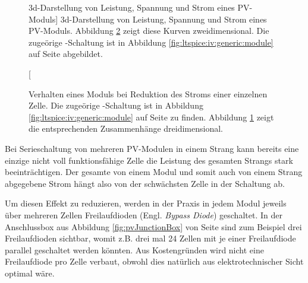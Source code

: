 \begin{figure}[h!tb]
    \centering
    
    \caption
    [3d-Darstellung von Leistung, Spannung und Strom eines PV-Moduls]
    {%
        3d-Darstellung  von  Leistung,  Spannung und  Strom  eines  PV-Moduls.
        Abbildung    \ref{fig:simu:iv-curves:module:generic}    zeigt    diese
        Kurven  zweidimensional.    Die  zuge\"orige  -Schaltung
        ist   in  Abbildung   \ref{fig:ltspice:iv:generic:module}  auf   Seite
        \pageref{fig:ltspice:iv:generic:module} abgebildet.%
    }
    \label{fig:simu:iv-curves:module:generic:3d}
\end{figure}

\begin{figure}[h!tb]
    \centering
    
    \caption[IV- und PV-Kurven eines PV-Moduls bei Leistungseinbruch]{%
        Verhalten   eines    Moduls   bei    Reduktion   des    Stroms   einer
        einzelnen   Zelle.
        Die   zuge\"orige  -Schaltung   ist
        in    Abbildung    \ref{fig:ltspice:iv:generic:module}    auf    Seite
        \pageref{fig:ltspice:iv:generic:module}    zu    finden.     Abbildung
        \ref{fig:simu:iv-curves:module:generic:3d}  zeigt  die  entsprechenden
        Zusammenh\"ange dreidimensional.%
    }
    \label{fig:simu:iv-curves:module:generic}
\end{figure}

Bei Serieschaltung von  mehreren PV-Modulen in einem Strang  kann bereits eine
einzige nicht voll  funktionsf\"ahige Zelle die Leistung  des gesamten Strangs
stark beeintr\"achtigen.  Der gesamte von einem Modul und somit auch von einem
Strang  abgegebene Strom  h\"angt  also  von der  schw\"achsten  Zelle in  der
Schaltung ab.

Um  diesen  Effekt  zu  reduzieren,  werden  in  der  Praxis  in  jedem  Modul
jeweils  \"uber mehreren  Zellen  Freilaufdioden  (Engl. \emph{Bypass  Diode})
geschaltet. In  der  Anschlussbox  aus Abbildung  \ref{fig:pvJunctionBox}  von
Seite  \pageref{fig:pvJunctionBox}  sind   zum  Beispiel  drei  Freilaufdioden
sichtbar, womit  z.B. drei mal 24  Zellen mit je einer  Freilaufdiode parallel
geschaltet werden k\"onnten. Aus Kostengr\"unden wird nicht eine Freilaufdiode
pro  Zelle  verbaut,  obwohl  dies nat\"urlich  aus  elektrotechnischer  Sicht
optimal w\"are.

